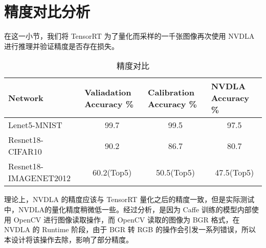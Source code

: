 \section{精度对比分析}

在这一小节，我们将 TensorRT 为了量化而采样的一千张图像再次使用 NVDLA 进行推理并验证精度是否存在损失。

\begin{table}[!htbp]
    \caption{精度对比}
    \label{tab:Qualifications Report}
    \centering
    \footnotesize%
    \setlength{\tabcolsep}{4pt}%
    \renewcommand{\arraystretch}{1.2}%
    \begin{tabular}{lccc}
        \toprule
        \textbf{Network}      & \multicolumn{1}{l}{\textbf{Valiadation Accuracy \%}} & \multicolumn{1}{l}{\textbf{Calibration Accuracy \%}}  & \multicolumn{1}{l}{\textbf{NVDLA Accuracy \%}} \\
        \midrule
        Lenet5-MNIST          & 99.7                                                 & 99.5                                                 & 97.5                                                 \\  
        Resnet18-CIFAR10      & 90.2                                                 & 86.7                                                 & 80.7                                                 \\
        Resnet18-IMAGENET2012 & 60.2(Top5)                                           & 50.5(Top5)                                           & 47.5(Top5)                                           \\
        \bottomrule                   
    \end{tabular}
\end{table}

理论上，NVDLA 的精度应该与 TensorRT 量化之后的精度一致，但是实际测试中，NVDLA的量化精度稍微低一些。经过分析，是因为 Caffe 训练的模型内部使用 OpenCV 进行图像读取操作，而 OpenCV 读取的图像为 BGR 格式，在 NVDLA 的 Runtime 阶段，由于 BGR 转 RGB 的操作会引发一系列错误，所以本设计将该操作去除，影响了部分精度。
